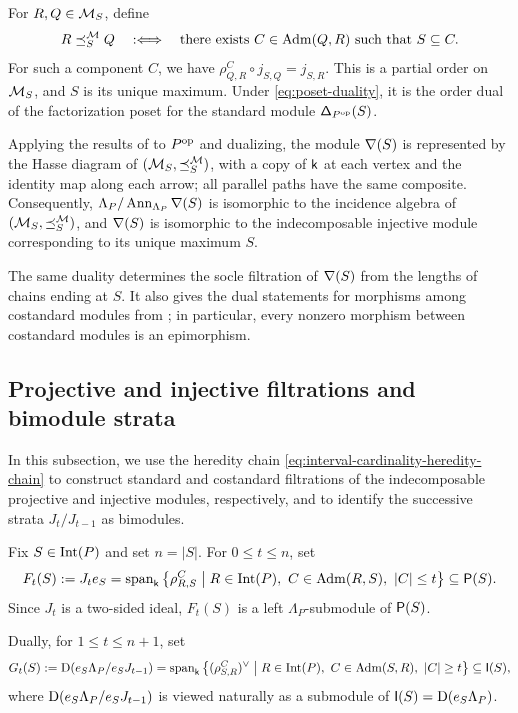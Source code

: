 For $R,Q\in\mathcal M_S$, define
\begin{equation}
\label{eq:costandard-factorization-order}
R\preceq_S^{\mathcal M}Q
\quad:\Longleftrightarrow\quad
\text{there exists } C\in\operatorname{Adm}(Q,R)
\text{ such that } S\subseteq C.
\end{equation}
For such a component $C$, we have
$\rho_{Q,R}^{C}\circ j_{S,Q}=j_{S,R}$.
This is a partial order on $\mathcal M_S$, and $S$ is its unique maximum.
Under \eqref{eq:poset-duality}, it is the order dual of the
factorization poset for the standard module $\mathsf\Delta_{P^{\mathrm{op}}}(S)$.

Applying the results of
 to $P^{\mathrm{op}}$ and dualizing,
the module $\mathsf\nabla(S)$ is represented by the Hasse diagram of
$(\mathcal M_S,\preceq_S^{\mathcal M})$, with a copy of $\mathsf{k}$ at each
vertex and the identity map along each arrow; all parallel paths have
the same composite. Consequently,
$\Lambda_P/\operatorname{Ann}_{\Lambda_P}\mathsf\nabla(S)$ is isomorphic to
the incidence algebra of $(\mathcal M_S,\preceq_S^{\mathcal M})$, and
$\mathsf\nabla(S)$ is isomorphic to the indecomposable injective module
corresponding to its unique maximum $S$.

The same duality determines the socle filtration of $\mathsf\nabla(S)$ from
the lengths of chains ending at $S$. It also gives the dual statements
for morphisms among costandard modules from
; in particular, every nonzero morphism
between costandard modules is an epimorphism.


\subsection{Projective and injective filtrations and bimodule strata}
\label{sec:standard-cardinality-filtrations}

In this subsection, we use the heredity chain
\eqref{eq:interval-cardinality-heredity-chain} to construct standard
and costandard filtrations of the indecomposable projective and
injective modules, respectively, and to identify the successive strata
$J_t/J_{t-1}$ as bimodules.


Fix $S\in\operatorname{Int}(P)$ and set $n=|S|$.
For $0\leq t\leq n$, set
\[
F_t(S)
:=
J_t e_S
=
\operatorname{span}_{\mathsf{k}}
\left\{
\rho_{R,S}^{C}
\;\middle|\;
R\in\operatorname{Int}(P),\ C\in\operatorname{Adm}(R,S),\ |C|\leq t
\right\}
\subseteq\mathsf P(S).
\]
Since $J_t$ is a two-sided ideal, $F_t(S)$ is a left
$\Lambda_P$-submodule of $\mathsf P(S)$.

Dually, for $1\leq t\leq n+1$, set
\[
G_t(S)
:=
\mathrm D(e_S\Lambda_P/e_SJ_{t-1})
=
\operatorname{span}_{\mathsf{k}}
\left\{
(\rho_{S,R}^{C})^{\vee}
\;\middle|\;
R\in\operatorname{Int}(P),\ C\in\operatorname{Adm}(S,R),\ |C|\geq t
\right\}
\subseteq\mathsf I(S),
\]
where $\mathrm D(e_S\Lambda_P/e_SJ_{t-1})$ is viewed naturally as a
submodule of $\mathsf I(S)=\mathrm D(e_S\Lambda_P)$.

